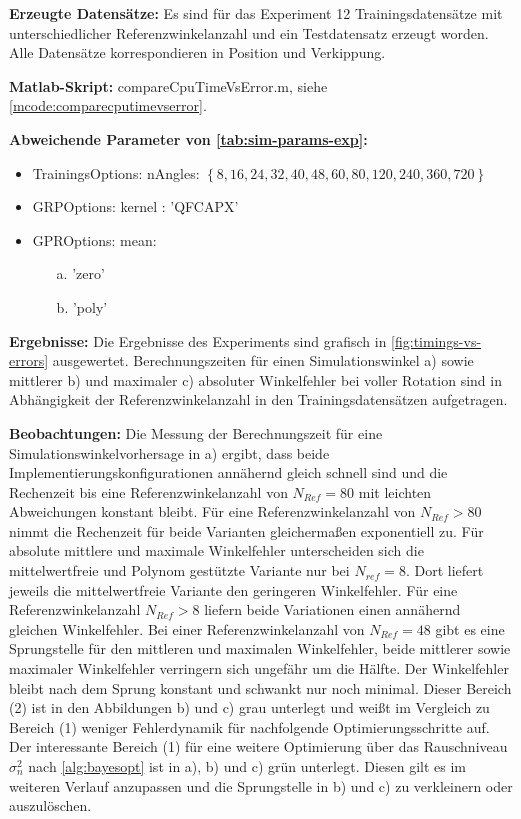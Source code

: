 \textbf{Erzeugte Datensätze:} Es sind für das Experiment 12 Trainingsdatensätze mit unterschiedlicher Referenzwinkelanzahl und ein Testdatensatz erzeugt worden. Alle Datensätze korrespondieren in Position und Verkippung.

\textbf{Matlab-Skript:} compareCpuTimeVsError.m, siehe \autoref{mcode:comparecputimevserror}.


\clearpage


\textbf{Abweichende Parameter von \autoref{tab:sim-params-exp}:}

\begin{itemize}
	\item TrainingsOptions: nAngles: $\left\{ 8, 16, 24, 32, 40, 48, 60, 80, 120, 240, 360, 720 \right\}$
	\item GRPOptions: kernel : 'QFCAPX'
	\item GPROptions: mean: 
	\begin{itemize}
		\item[a.] 'zero'
		\item[b.] 'poly'
	\end{itemize}
\end{itemize}

\textbf{Ergebnisse:} Die Ergebnisse des Experiments sind grafisch in \autoref{fig:timings-vs-errors} ausgewertet. Berechnungszeiten für einen Simulationswinkel a) sowie mittlerer b) und maximaler c) absoluter Winkelfehler bei voller Rotation sind in Abhängigkeit der Referenzwinkelanzahl in den Trainingsdatensätzen aufgetragen.

\textbf{Beobachtungen:} Die Messung der Berechnungszeit für eine Simulationswinkelvorhersage in a) ergibt, dass beide Implementierungskonfigurationen annähernd gleich schnell sind und die Rechenzeit bis eine Referenzwinkelanzahl von $N_{Ref} = 80$ mit leichten Abweichungen konstant bleibt. Für eine Referenzwinkelanzahl von $N_{Ref} > 80$ nimmt die Rechenzeit für beide Varianten gleichermaßen exponentiell zu. Für absolute mittlere und maximale Winkelfehler unterscheiden sich die mittelwertfreie und Polynom gestützte Variante nur bei $N_{ref} = 8$. Dort liefert jeweils die mittelwertfreie Variante den geringeren Winkelfehler. Für eine Referenzwinkelanzahl $N_{Ref} > 8$ liefern beide Variationen einen annähernd gleichen Winkelfehler. Bei einer Referenzwinkelanzahl von $N_{Ref} = 48$ gibt es eine Sprungstelle für den mittleren und maximalen Winkelfehler, beide mittlerer sowie maximaler Winkelfehler verringern sich ungefähr um die Hälfte. Der Winkelfehler bleibt nach dem Sprung konstant und schwankt nur noch minimal. Dieser Bereich (2) ist in den Abbildungen b) und c) grau unterlegt und weißt im Vergleich zu Bereich (1) weniger Fehlerdynamik für nachfolgende Optimierungsschritte auf. Der interessante Bereich (1) für eine weitere Optimierung über das Rauschniveau $\sigma_n^2$ nach \autoref{alg:bayesopt} ist in a), b) und c) grün unterlegt. Diesen gilt es im weiteren Verlauf anzupassen und die Sprungstelle in b) und c) zu verkleinern oder auszulöschen.


